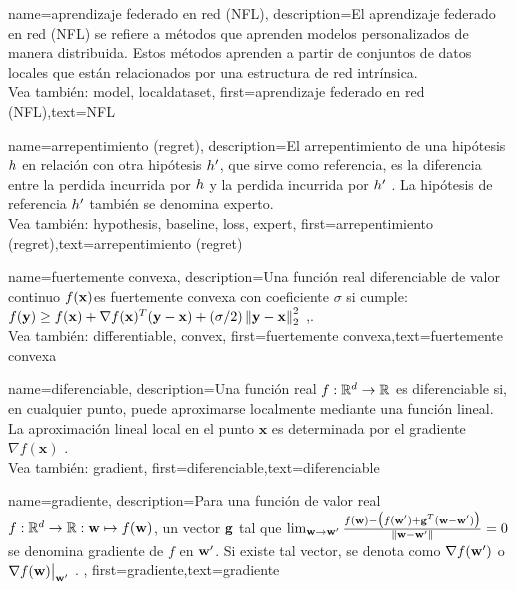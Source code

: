 {name={aprendizaje federado en red (NFL)},
	description={El aprendizaje federado en red (NFL) se refiere 
		a métodos que aprenden modelos personalizados de manera distribuida. Estos métodos aprenden a partir de conjuntos de datos locales 
		que están relacionados por una estructura de red intrínsica.
		\\
		Vea también: \gls{model}, \gls{localdataset}},
 first={aprendizaje federado en red (NFL)},text={NFL} 
}




{name={arrepentimiento (regret)},
	description={El arrepentimiento de una hipótesis $h$ en relación con otra 
		hipótesis $h'$, que sirve como referencia, 
		es la diferencia entre la perdida incurrida por $h$ y la perdida 
		incurrida por $h'$ \cite{PredictionLearningGames}. 
		La hipótesis de referencia $h'$ también se denomina experto.
		\\
		Vea también: \gls{hypothesis}, \gls{baseline}, \gls{loss}, \gls{expert}},
	first={arrepentimiento (regret)},text={arrepentimiento (regret)} 
}

{name={fuertemente convexa},
	description={Una función real diferenciable de valor continuo 
		 $f({\bf x})$es fuertemente convexa con coeficiente $\sigma$ si cumple: $f({\bf y}) \geq f({\bf x}) + \nabla f({\bf x})^{T} ({\bf y} - {\bf x}) + (\sigma/2) \left\Vert {{\bf y}- {\bf x}} \right\Vert_{2}^{2}$ \cite{nesterov04},\cite[Sec. B.1.1]{CvxAlgBertsekas}.
		 \\
		Vea también: \gls{differentiable}, \gls{convex}},
	first={fuertemente convexa},text={fuertemente convexa} 
}

{name={diferenciable},
	description={Una función real $f: \mathbb{R}^{d} \rightarrow \mathbb{R}$ 
		es diferenciable si, en cualquier punto, puede aproximarse localmente mediante una función lineal.
		La aproximación lineal local en el punto $\mathbf{x}$ es determinada por el 
		gradiente $\nabla f ( \mathbf{x})$ \cite{RudinBookPrinciplesMatheAnalysis}.
		\\
		Vea también: \gls{gradient}},
	first={diferenciable},text={diferenciable} 
}

{name={gradiente},
	description={Para una función de valor real $f: \mathbb{R}^{d} \rightarrow \mathbb{R}: {\bf w} \mapsto f({\bf w})$, 
	un vector ${\bf g}$ tal que $\lim_{{\bf w} \rightarrow {\bf w}'} \frac{f({\bf w}) - \big(f({\bf w}')+ {\bf g}^{T} ({\bf w}- {\bf w}') \big) }{\| {\bf w}-{\bf w}'\|}=0$ 
	se denomina gradiente de $f$ en ${\bf w}'$. Si existe tal vector, se denota como
	$\nabla f({\bf w}')$ o $\nabla f({\bf w})\big|_{{\bf w}'}$ \cite{RudinBookPrinciplesMatheAnalysis}.
	},
	first={gradiente},text={gradiente} 
}

